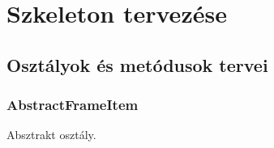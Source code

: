 

\usepackage{enumitem}



\fedlap

\addtocounter{section}{7}
\section{Szkeleton tervezése}
	\subsection{Osztályok és metódusok tervei}
		\subsubsection{AbstractFrameItem} Absztrakt osztály.

